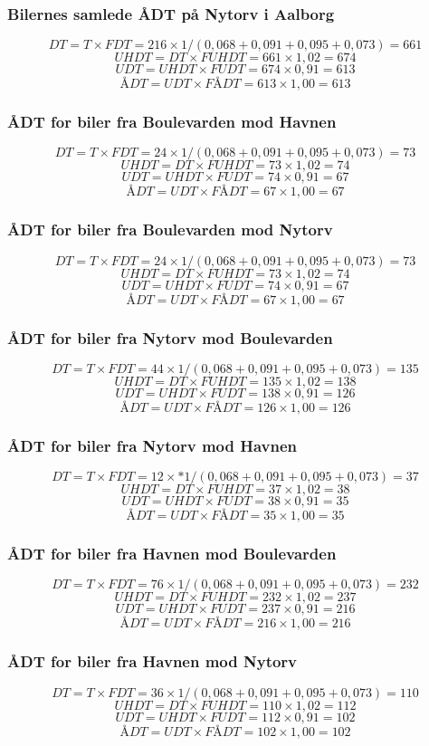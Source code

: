 \subsubsection{Bilernes samlede ÅDT på Nytorv i Aalborg}
$$DT = T \times FDT = 216 \times 1/(0,068+0,091+0,095+0,073) = 661$$
$$UHDT = DT \times FUHDT = 661 \times 1,02 = 674$$
$$UDT = UHDT \times FUDT = 674 \times 0,91 = 613$$
$$ÅDT = UDT \times FÅDT = 613 \times 1,00 = 613$$
\subsubsection{ÅDT for biler fra Boulevarden mod Havnen}
$$DT = T \times FDT = 24 \times 1/(0,068+0,091+0,095+0,073) = 73$$
$$UHDT = DT \times FUHDT = 73 \times 1,02 = 74$$
$$UDT = UHDT \times FUDT = 74 \times 0,91 = 67$$
$$ÅDT = UDT \times FÅDT = 67 \times 1,00 = 67$$
\subsubsection{ÅDT for biler fra Boulevarden mod Nytorv}
$$DT = T \times FDT = 24 \times 1/(0,068+0,091+0,095+0,073) = 73$$
$$UHDT = DT \times FUHDT = 73 \times 1,02 = 74$$
$$UDT = UHDT \times FUDT = 74 \times 0,91 = 67$$
$$ÅDT = UDT \times FÅDT = 67 \times 1,00 = 67$$
\subsubsection{ÅDT for biler fra Nytorv mod Boulevarden}
$$DT = T \times FDT = 44 \times 1/(0,068+0,091+0,095+0,073) = 135$$
$$UHDT = DT \times FUHDT = 135 \times 1,02 = 138$$
$$UDT = UHDT \times FUDT = 138 \times 0,91 = 126$$
$$ÅDT = UDT \times FÅDT = 126 \times 1,00 = 126$$
\subsubsection{ÅDT for biler fra Nytorv mod Havnen}
$$DT = T \times FDT = 12 \times* 1/(0,068+0,091+0,095+0,073) = 37$$
$$UHDT = DT \times FUHDT = 37 \times 1,02 = 38$$
$$UDT = UHDT \times FUDT = 38 \times 0,91 = 35$$
$$ÅDT = UDT \times FÅDT = 35 \times 1,00 = 35$$
\subsubsection{ÅDT for biler fra Havnen mod Boulevarden}
$$DT = T \times FDT = 76 \times 1/(0,068+0,091+0,095+0,073) = 232$$
$$UHDT = DT \times FUHDT = 232 \times 1,02 = 237$$
$$UDT = UHDT \times FUDT = 237 \times 0,91 = 216$$
$$ÅDT = UDT \times FÅDT = 216 \times 1,00 = 216$$
\subsubsection{ÅDT for biler fra Havnen mod Nytorv}
$$DT = T \times FDT = 36 \times 1/(0,068+0,091+0,095+0,073) = 110$$
$$UHDT = DT \times FUHDT = 110 \times 1,02 = 112$$
$$UDT = UHDT \times FUDT = 112 \times 0,91 = 102$$
$$ÅDT = UDT \times FÅDT = 102 \times 1,00 = 102$$
